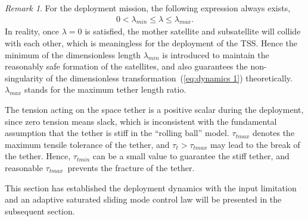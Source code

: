 \documentclass[3p]{elsarticle}
\theoremstyle{plain}
\theoremstyle{remark}
\newtheorem{myrem}{Remark}
\begin{document}
\begin{myrem}

For the deployment mission, the following expression always exists,
\begin{align}
0<\lambda_{min}\le\lambda\le \lambda_{max}\label{eq:lambda}.
\end{align}
In reality, once $\lambda = 0$ is satisfied, the mother satellite and subsatellite will collide with each other, which is meaningless for the deployment of the TSS. Hence the minimum of the dimensionless length $\lambda_{min}$ is introduced to maintain the reasonably safe formation of the satellites, and also guarantees the non-singularity of the dimensionless transformation~(\ref{eq:dynamics 1}) theoretically. $\lambda_{max}$ stands for the maximum tether length ratio.\par
The tension acting on the space tether is a positive scalar during the deployment, since zero tension means slack, which is inconsistent with the fundamental assumption that the tether is stiff in the ``rolling ball'' model. $\tau_{tmax}$ denotes the maximum tensile tolerance of the tether, and $\tau_t>\tau_{tmax}$ may lead to the break of the tether. Hence, $\tau_{tmin}$ can be a small value to guarantee the stiff tether, and reasonable $\tau_{tmax}$\ prevents the fracture of the tether.
\end{myrem}
This section has established the deployment dynamics with the input limitation and an adaptive saturated sliding mode control law will be presented in the subsequent section.
\end{document}

